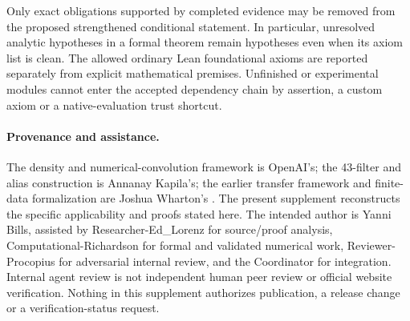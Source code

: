 \documentclass[11pt]{article}
\begin{document}
Only exact obligations supported by completed evidence may be removed
from the proposed strengthened conditional statement. In particular,
unresolved analytic hypotheses in a formal theorem remain hypotheses
even when its axiom list is clean. The allowed ordinary Lean foundational
axioms are reported separately from explicit mathematical premises.
Unfinished or experimental modules cannot enter the accepted dependency
chain by assertion, a custom axiom or a native-evaluation trust shortcut.

\paragraph{Provenance and assistance.}
The density and numerical-convolution framework is OpenAI's; the 43-filter
and alias construction is Annanay Kapila's; the earlier transfer framework
and finite-data formalization are Joshua Wharton's
\cite{openai,kapila,wharton}. The present supplement reconstructs the
specific applicability and proofs stated here. The intended author is
Yanni Bills, assisted by Researcher-Ed\_Lorenz for source/proof analysis,
Computational-Richardson for formal and validated numerical work,
Reviewer-Procopius for adversarial internal review, and the Coordinator
for integration. Internal agent review is not independent human peer
review or official website verification. Nothing in this supplement
authorizes publication, a release change or a verification-status request.



\end{document}
